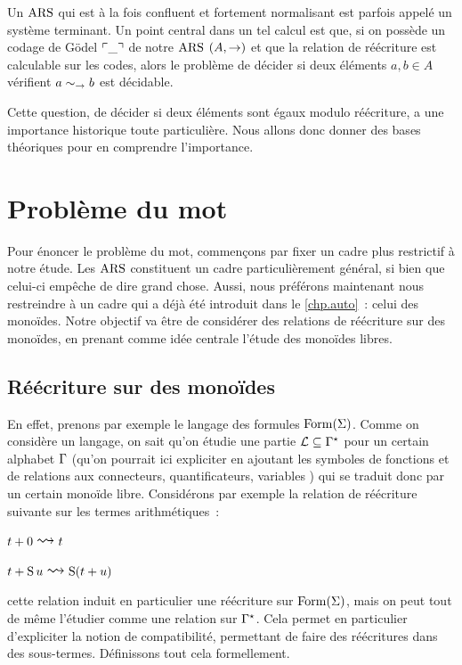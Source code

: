 Un $\operatorname{ARS}$ qui est à la fois confluent et fortement normalisant est parfois
appelé un système terminant. Un point central dans un tel calcul est que, si on
possède un codage de Gödel $\ulcorner\mathord{\_}\urcorner$ de notre $\operatorname{ARS}$ $(A,\mathrel{\to})$ et que la
relation de réécriture est calculable sur les codes, alors le problème de
décider si deux éléments $a,b \in A$ vérifient $a\sim_{\mathord{\mathrel{\to}}} b$ est décidable.

Cette question, de décider si deux éléments sont égaux modulo réécriture,
a une importance historique toute particulière. Nous allons donc donner des
bases théoriques pour en comprendre l'importance.

\section{Problème du mot}

Pour énoncer le problème du mot, commençons par fixer un cadre plus restrictif à
notre étude. Les $\operatorname{ARS}$ constituent un cadre particulièrement général, si bien
que celui-ci empêche de dire grand chose. Aussi, nous préférons maintenant nous
restreindre à un cadre qui a déjà été introduit dans le \cref{chp.auto}~: celui
des monoïdes. Notre objectif va être de considérer des relations de réécriture
sur des monoïdes, en prenant comme idée centrale l'étude des monoïdes libres.

\subsection{Réécriture sur des monoïdes}

En effet, prenons par exemple le langage des formules $\operatorname{Form}(\Sigma)$. Comme
on considère un langage, on sait qu'on étudie une partie
$\mathcal L\subseteq \Gamma^{\star}$
pour un certain alphabet $\Gamma$ (qu'on pourrait ici expliciter en ajoutant les
symboles de fonctions et de relations aux connecteurs, quantificateurs,
variables ) qui se traduit donc par un certain monoïde libre.
Considérons par exemple la relation de réécriture suivante sur les termes
arithmétiques~:
\begin{itemize}
  \begin{minipage}{0.45\textwidth}
  \item $t + 0 \reecr{} t$
  \end{minipage}
  \begin{minipage}{0.45\textwidth}
  \item $t + \Ss u \reecr{} \Ss(t + u)$
  \end{minipage}
\end{itemize}
cette relation induit en particulier une réécriture sur $\operatorname{Form}(\Sigma)$, mais
on peut tout de même l'étudier comme une relation sur $\Gamma^{\star}$. Cela permet en
particulier d'expliciter la notion de compatibilité, permettant de faire des
réécritures dans des sous-termes. Définissons tout cela formellement.

